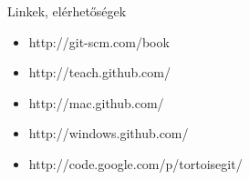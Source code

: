 
\begin{frame}{Linkek, elérhetőségek}
    \begin{itemize}
        \item http://git-scm.com/book
        \item http://teach.github.com/
        \item http://mac.github.com/
        \item http://windows.github.com/
        \item http://code.google.com/p/tortoisegit/
    \end{itemize}
\end{frame}

